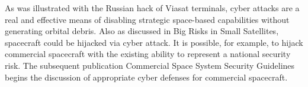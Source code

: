 As was illustrated with the Russian hack of Viasat terminals, cyber attacks are a real and effective means of disabling strategic space-based capabilities without generating orbital debris.  Also as discussed in Big Risks in Small Satellites, spacecraft could be hijacked via cyber attack.  It is possible, for example, to hijack commercial spacecraft with the existing ability to represent a national security risk.  The subsequent publication Commercial Space System Security Guidelines begins the discussion of appropriate cyber defenses for commercial spacecraft.
